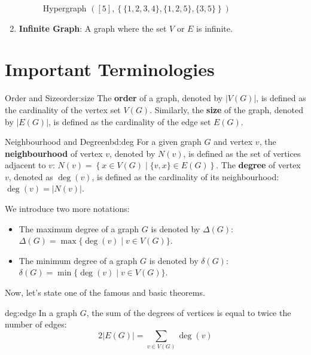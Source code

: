 \documentclass[../basic_graph_theory.tex]{subfiles}
\begin{document}
\begin{enumerate}
\begin{figure}[hbt!]
          \caption{Hypergraph $ \left( [5], \left\{ \{ 1, 2, 3, 4 \}, \{ 1, 2, 5 \}, \{ 3, 5 \} \right\} \right) $}
          \label{fig:hypergraph}
        \end{figure}
  \item \textbf{Infinite Graph}: A graph where the set $V$ or $E$ is infinite.
\end{enumerate}

\section{Important Terminologies}

\begin{Def}{Order and Size}{order:size}
  The \textbf{order} of a graph, denoted by $|V(G)|$, is defined as the cardinality of the vertex set $V(G)$. Similarly, the \textbf{size} of the graph, denoted by $|E(G)|$, is defined as the cardinality of the edge set $E(G)$.
\end{Def}

\begin{Def}{Neighbourhood and Degree}{nbd:deg}
  For a given graph $G$ and vertex $v$, the \textbf{neighbourhood} of vertex $v$, denoted by $N(v)$, is defined as the set of vertices adjacent to $v$: $N(v) = \left\{x \in V(G) \mid \{v,x\} \in E(G)\right\}$. The \textbf{degree} of vertex $v$, denoted as $\deg(v)$, is defined as the cardinality of its neighbourhood: $\deg(v) = |N(v)|$.
\end{Def}

We introduce two more notations:

\begin{itemize}
  \item The maximum degree of a graph $G$ is denoted by $\Delta(G)$: $\Delta(G) = \max\{\deg(v) \mid v \in V(G)\}$.
  \item The minimum degree of a graph $G$ is denoted by $\delta(G)$: $\delta(G) = \min\{\deg(v) \mid v \in V(G)\}$.
\end{itemize}

Now, let's state one of the famous and basic theorems.

\begin{Thm}{}{deg:edge}
  \label{ref:3}
  In a graph $G$, the sum of the degrees of vertices is equal to twice the number of edges:
  \[ 2 |E(G)| = \sum_{v \in V(G)}\deg(v) \]
\end{Thm}
\end{document}
